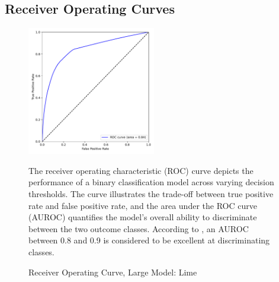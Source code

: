 \documentclass[12pt]{article}
\begin{document}
\subsection{Receiver Operating Curves}
\begin{figure}[H]
    \centering
    \caption{Receiver Operating Curve, Large Model: Lime}
    \includegraphics[width=0.5\textwidth]{../output/lightgbm_roc_lime.pdf}
    \begin{minipage}{0.6\textwidth}
    \tiny
    The receiver operating characteristic (ROC) curve depicts the performance of a binary classification model across varying decision thresholds. The curve illustrates the trade-off between true positive rate and false positive rate, and the area under the ROC curve (AUROC) quantifies the model's overall ability to discriminate between the two outcome classes. According to \textcite{mandrekar_receiver_2010}, an AUROC between 0.8 and 0.9 is considered to be excellent at discriminating classes.
    \end{minipage}
    \label{fig:roc_lime}
\end{figure}
\end{document}
